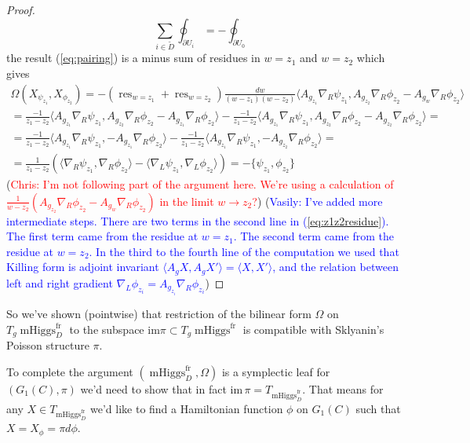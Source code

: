 \documentclass[11pt, oneside, reqno]{amsart}
\theoremstyle{definition} \newtheorem{definition}{Definition}[section]
\theoremstyle{definition} \newtheorem{remark}[definition]{Remark}
\theoremstyle{definition} \newtheorem{remarks}[definition]{Remarks}
\theoremstyle{definition} \newtheorem{question}[definition]{Question}
\theoremstyle{definition} \newtheorem*{note}{Note}
\theoremstyle{definition} \newtheorem{example}[definition]{Example}
\theoremstyle{definition} \newtheorem{examples}[definition]{Examples}
\DeclareMathOperator{\res}{res}
\DeclareMathOperator{\mhiggs}{mHiggs}
\newcommand{\fr}{\mathrm{fr}}
\newcommand{\chris}[1]{(\textcolor{red}{Chris: #1})}
\newcommand{\vasily}[1]{(\textcolor{blue}{Vasily: #1})}
\begin{document}
\begin{proof}
\begin{equation}
\label{eq:residue}
  \sum_{i \in \tilde D} \oint_{\partial U_i }  = - \oint_{\partial U_0} 
\end{equation}
the result (\ref{eq:pairing}) is a minus sum of residues in $w = z_1$ and $w = z_2$
which gives
  \begin{multline}
\label{eq:z1z2residue}
   \Omega(X_{\psi_{z_1}}, X_{\phi_{z_2}}) = - (\res_{w = z_1}  + \res_{w = z_2}) \frac{dw }{(w - z_1)(w - z_2)} \langle A_{g_{z_1}} \nabla_{R} \psi_{z_1},
   A_{g_{z_2}} \nabla_{R} \phi_{z_2}  - A_{g_w} \nabla_{R} \phi_{z_2} \rangle \\
   =   \frac{-1}{z_1 - z_2}  \langle A_{g_{z_1}} \nabla_{R} \psi_{z_1} , A_{g_{z_2}} \nabla_{R} \phi_{z_2}  - A_{g_{z_1}} \nabla_{R} \phi_{z_2} \rangle   - \frac{-1}{z_1 - z_2}  \langle A_{g_{z_1}} \nabla_{R} \psi_{z_1} , A_{g_{z_2}} \nabla_{R} \phi_{z_2}  - A_{g_{z_2}} \nabla_{R} \phi_{z_2}   \rangle =\\
      =   \frac{-1}{z_1 - z_2}  \langle A_{g_{z_1}} \nabla_{R} \psi_{z_1} ,  - A_{g_{z_1}} \nabla_{R} \phi_{z_2} \rangle   - \frac{-1}{z_1 - z_2}  \langle A_{g_{z_1}} \nabla_{R} \psi_{z_1} ,  - A_{g_{z_2}} \nabla_{R} \phi_{z_2}   \rangle =\\
   = \frac{1}{z_1 - z_2} (\langle \nabla_{R} \psi_{z_1} , \nabla_{R} \phi_{z_2}\rangle - 
   \langle  \nabla_{L} \psi_{z_1} , \nabla_{L} \phi_{z_2} \rangle ) =
   - \{\psi_{z_1}, \phi_{z_2} \} 
  \end{multline}
  \chris{I'm not following part of the argument here.  We're using a calculation of $\frac 1{w-z_2}(A_{g_{z_2}} \nabla_{R} \phi_{z_2}  - A_{g_w} \nabla_{R} \phi_{z_2})$ in the limit $w\to z_2$?}
  \vasily{I've added more intermediate steps. There are two terms in the second line in (\ref{eq:z1z2residue}).
    The first term came from  the residue at $w=z_1$.
    The second term came from the residue at $w=z_2$. 
In the third to the fourth line of the computation we used that Killing form is adjoint invariant
$\langle A_{g} X, A_{g} X' \rangle = \langle X, X' \rangle $,
and the relation between left and right gradient $\nabla_{L} \phi_{z_i} = A_{g_{z_i}} \nabla_{R} \phi_{z_i}$}
\end{proof}

So we've shown (pointwise) that restriction of the bilinear form $\Omega$ on $T_g\mhiggs^{\fr}_{D}$
  to the subspace $\mathrm{im} \pi \subset T_g\mhiggs^{\fr}$ is compatible with
Sklyanin's Poisson structure $\pi$.

To complete the argument  $(\mhiggs^{\fr}_{D}, \Omega)$ is
a symplectic leaf for $(G_1(C), \pi)$ we'd need to show that in fact
$\mathrm{im} \, \pi = T_{\mhiggs^{\fr}_{D}}$.
That means for any $X \in T_{\mhiggs^{\fr}_{D}} $ we'd like to find a Hamiltonian
function $\phi$ on $G_1(C)$ such that $X = X_{\phi} = \pi d \phi$.
\end{document}
